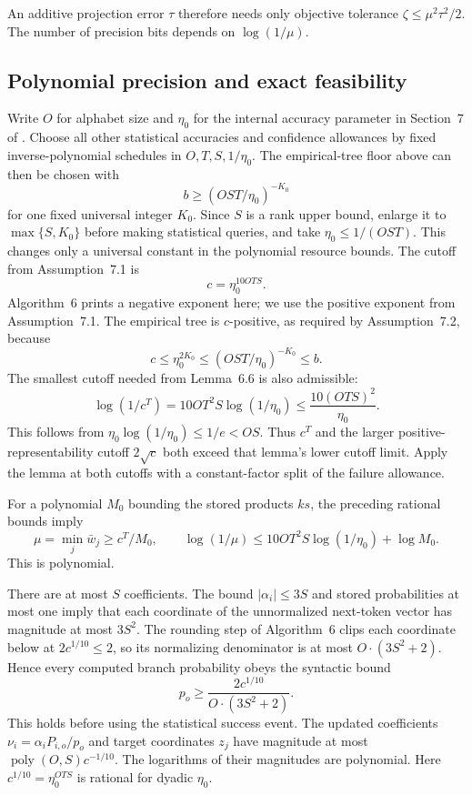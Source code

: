 \documentclass[11pt]{article}
\newcommand{\poly}{\operatorname{poly}}
\theoremstyle{definition}
\theoremstyle{remark}
\begin{document}
An additive projection error $\tau$ therefore needs only objective tolerance
$\zeta\le\mu^2\tau^2/2$. The number of precision bits depends on $\log(1/\mu)$.

\subsection{Polynomial precision and exact feasibility}

Write $O$ for alphabet size and $\eta_0$ for the internal accuracy parameter in Section~7 of \citet{liu-moitra}. Choose all other statistical accuracies and confidence allowances by fixed inverse-polynomial schedules in $O,T,S,1/\eta_0$. The empirical-tree floor above can then be chosen with
\[
b\ge(OST/\eta_0)^{-K_0}
\]
for one fixed universal integer $K_0$. Since $S$ is a rank upper bound, enlarge it to $\max\{S,K_0\}$ before making statistical queries, and take $\eta_0\le1/(OST)$. This changes only a universal constant in the polynomial resource bounds. The cutoff from Assumption~7.1 is
\[
c=\eta_0^{10OTS}.
\]
Algorithm~6 prints a negative exponent here; we use the positive exponent from Assumption~7.1. The empirical tree is $c$-positive, as required by Assumption~7.2, because
\[
c\le\eta_0^{2K_0}\le(OST/\eta_0)^{-K_0}\le b.
\]
The smallest cutoff needed from Lemma~6.6 is also admissible:
\[
\log(1/c^T)=10OT^2S\log(1/\eta_0)
\le\frac{10(OTS)^2}{\eta_0}.
\]
This follows from $\eta_0\log(1/\eta_0)\le1/e<OS$. Thus $c^T$ and the larger positive-representability cutoff $2\sqrt c$ both exceed that lemma's lower cutoff limit. Apply the lemma at both cutoffs with a constant-factor split of the failure allowance.

For a polynomial $M_0$ bounding the stored products $ks$, the preceding rational bounds imply
\[
\mu=\min_j\bar w_j\ge c^T/M_0,\qquad
\log(1/\mu)\le10OT^2S\log(1/\eta_0)+\log M_0.
\]
This is polynomial.

There are at most $S$ coefficients. The bound $|\alpha_i|\le3S$ and stored probabilities at most one imply that each coordinate of the unnormalized next-token vector has magnitude at most $3S^2$. The rounding step of Algorithm~6 clips each coordinate below at $2c^{1/10}\le2$, so its normalizing denominator is at most $O\cdot(3S^2+2)$. Hence every computed branch probability obeys the syntactic bound
\[
p_o\ge\frac{2c^{1/10}}{O\cdot(3S^2+2)}.
\]
This holds before using the statistical success event. The updated coefficients $\nu_i=\alpha_i P_{i,o}/p_o$ and target coordinates $z_j$ have magnitude at most $\poly(O,S)c^{-1/10}$. The logarithms of their magnitudes are polynomial. Here $c^{1/10}=\eta_0^{OTS}$ is rational for dyadic $\eta_0$.
\end{document}
